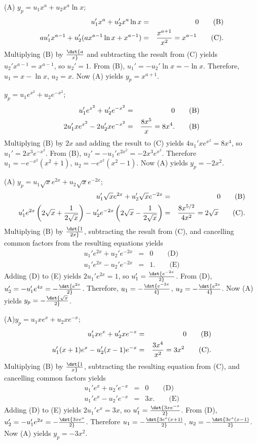 \documentclass[dvips]{book}
\renewcommand{\exer}[1]{\par\medskip\;\noindent{\color{red}\bf #1.}}
\numberwithin{example}{section}
\numberwithin{equation}{section}
\numberwithin{theorem}{section}
\numberwithin{table}{section}
\numberwithin{figure}{section}
\begin{document}
\exer{5.7.16}
(A) $y_p=u_1x^a+u_2x^a\ln x$;
\setcounter{equation}{1}
\begin{eqnarray*}
u_1'x^a+u_2'x^a\ln x&=&0\qquad\text{(B)}\\ %
au_1'x^{a-1}+u_2'(ax^{a-1}\ln x+x^{a-1})&=&{x^{a+1}\over
x^2}=x^{a-1}\qquad\text{(C)}. %
\end{eqnarray*}
Multiplying (B) by $\dst{a\over x}$ and subtracting
the result from (C) yields $u_2'x^{a-1}=x^{a-1}$, so
$u_2'=1$. From (B), $u_1'=-u_2'\ln x=-\ln x$.
Therefore, $u_1=x-\ln x$, $u_2=x$. Now (A) yields $y_p=x^{a+1}$.


\exer{5.7.18}
$y_p=u_1e^{x^2}+u_2e^{-x^2}$;
\setcounter{equation}{1}
\begin{eqnarray*}
u_1'e^{x^2} +u_2'e^{-x^2}&=&0\qquad\text{(B)}\\ %
2u_1'xe^{x^2}-2u_2'xe^{-x^2}&=&{8x^5\over
x}=8x^4. \qquad\text{(B)}%
\end{eqnarray*}
Multiplying (B) by $2x$ and adding the result to
(C) yields $4u_1'xe^{x^2}=8x^4$, so
$u_1'=2x^3e^{-x^2}$. From (B),
$u_2'=-u_1'e^{2x^2}=-2x^3e^{x^2}$. Therefore $u_1=-e^{-x^2}(x^2+1)$,
$u_2=-e^{x^2}(x^2-1)$. Now (A) yields $y_p=-2x^2$.


\exer{5.7.20}
(A) $y_p=u_1\sqrt xe^{2x}+u_2\sqrt xe^{-2x}$;
\setcounter{equation}{1}
\begin{eqnarray*}
u_1'\sqrt xe^{2x}+u_2'\sqrt xe^{-2x}&=&0\qquad\text{(B)}\\ %
u_1'e^{2x}\left(2\sqrt x+{1\over2\sqrt x}\right)-u_2'e^{-2x}
\left(2\sqrt x-{1\over2\sqrt x}\right)&=&{8x^{5/2}\over4x^2}
=2\sqrt x\qquad\text{(C)}. %
\end{eqnarray*}
Multiplying (B) by $\dst{1\over2x}$, subtracting the
result from (C), and cancelling common factors from
the resulting equations yields
\begin{eqnarray*}
u_1'e^{2x}+u_2'e^{-2x}&=&0\qquad\text{(D)}\\ %
u_1'e^{2x}-u_2'e^{-2x}&=&1.\qquad\text{(E)} %
\end{eqnarray*}
Adding (D) to (E) yields
$2u_1'e^{2x}=1$, so $u_1'=\dst{e^{-2x}\over2}$. From
(D), $u_2'=-u_1'e^{4x}=-\dst{e^{2x}\over2}$.
Therefore, $u_1=-\dst{e^{-2x}\over4}$, $u_2=-\dst{e^{2x}\over4}$. Now
(A) yields $y_p=-\dst{\sqrt x\over2}$.


\exer{5.7.22}
(A)$y_p=u_1xe^x+u_2xe^{-x}$;
\begin{eqnarray*}
u_1'xe^x+u_2'xe^{-x}&=&0\qquad\text{(B)}\\ %
u_1'(x+1)e^x-u_2'(x-1)e^{-x}&=&{3x^4\over x^2}=3x^2\qquad\text{(C)}.
\end{eqnarray*}
Multiplying (B) by $\dst{1\over x}$, subtracting the
resulting equation from (C), and cancelling common
factors yields
\begin{eqnarray*}
u_1'e^x+u_2'e^{-x}&=&0\qquad\text{(D)}\\ %
u_1'e^x-u_2'e^{-x}&=&3x.\qquad\text{(E)} %
\end{eqnarray*}
Adding (D) to (E) yields
$2u_1'e^x=3x$, so $u_1'=\dst{3xe^{-x}\over2}$. From
(D), $u_2'=-u_1'e^{2x}=-\dst{3xe^x\over2}$.
Therefore $u_1=-\dst{3e^x(x+1)\over2}$, $u_2=-\dst{3e^x(x-1)\over2}$.
Now (A) yields $y_p=-3x^2$.
\end{document}
